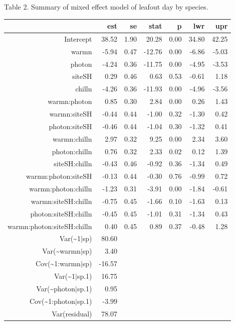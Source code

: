 \documentclass[11pt]{article}
\begin{document}
Table 2. Summary of mixed effect model of leafout day by species.

\begin{table}[ht]
\centering
\begin{tabular}{rrrrrrr}
  \hline
 & est & se & stat & p & lwr & upr \\ 
  \hline
Intercept & 38.52 & 1.90 & 20.28 & 0.00 & 34.80 & 42.25 \\ 
  warmn & -5.94 & 0.47 & -12.76 & 0.00 & -6.86 & -5.03 \\ 
  photon & -4.24 & 0.36 & -11.75 & 0.00 & -4.95 & -3.53 \\ 
  siteSH & 0.29 & 0.46 & 0.63 & 0.53 & -0.61 & 1.18 \\ 
  chilln & -4.26 & 0.36 & -11.93 & 0.00 & -4.96 & -3.56 \\ 
  warmn:photon & 0.85 & 0.30 & 2.84 & 0.00 & 0.26 & 1.43 \\ 
  warmn:siteSH & -0.44 & 0.44 & -1.00 & 0.32 & -1.30 & 0.42 \\ 
  photon:siteSH & -0.46 & 0.44 & -1.04 & 0.30 & -1.32 & 0.41 \\ 
  warmn:chilln & 2.97 & 0.32 & 9.25 & 0.00 & 2.34 & 3.60 \\ 
  photon:chilln & 0.76 & 0.32 & 2.33 & 0.02 & 0.12 & 1.39 \\ 
  siteSH:chilln & -0.43 & 0.46 & -0.92 & 0.36 & -1.34 & 0.49 \\ 
  warmn:photon:siteSH & -0.13 & 0.44 & -0.30 & 0.76 & -0.99 & 0.72 \\ 
  warmn:photon:chilln & -1.23 & 0.31 & -3.91 & 0.00 & -1.84 & -0.61 \\ 
  warmn:siteSH:chilln & -0.75 & 0.45 & -1.66 & 0.10 & -1.63 & 0.13 \\ 
  photon:siteSH:chilln & -0.45 & 0.45 & -1.01 & 0.31 & -1.34 & 0.43 \\ 
  warmn:photon:siteSH:chilln & 0.40 & 0.45 & 0.89 & 0.37 & -0.48 & 1.28 \\ 
           Var(\~{}1$|$sp) & 80.60 &  &  &  &  &  \\ 
       Var(\~{}warmn$|$sp) & 3.40 &  &  &  &  &  \\ 
     Cov(\~{}1:warmn$|$sp) & -16.57 &  &  &  &  &  \\ 
         Var(\~{}1$|$sp.1) & 16.75 &  &  &  &  &  \\ 
    Var(\~{}photon$|$sp.1) & 0.95 &  &  &  &  &  \\ 
  Cov(\~{}1:photon$|$sp.1) & -3.99 &  &  &  &  &  \\ 
        Var(residual) & 78.07 &  &  &  &  &  \\ 
   \hline
\end{tabular}
\end{table}
\end{document}
